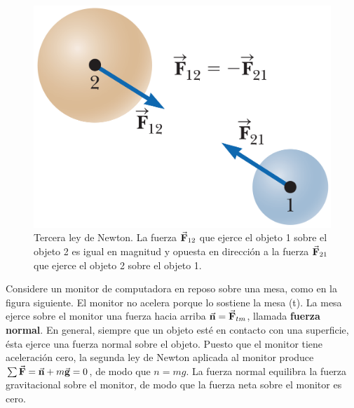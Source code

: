     \begin{figure}[H]
      \centering
      \includegraphics[scale=0.15]{1/graphics_5/figure_2}
      \caption{Tercera ley de Newton. La fuerza $\vec{\mathbf{F}}_{12}$ que ejerce el objeto 1 sobre el objeto 2 es igual en
      magnitud y opuesta en dirección a la fuerza $\vec{\mathbf{F}}_{21}$ que ejerce el objeto 2 sobre el objeto 1.}
    \end{figure}

    \PN Considere un monitor de computadora en reposo sobre una mesa, como en la figura siguiente. El monitor no acelera
    porque lo sostiene la mesa (t). La mesa ejerce sobre el monitor una fuerza hacia arriba $\vec{\mathbf{n}} = \vec{\mathbf{F}}_{tm}$,
    llamada \textbf{fuerza normal}. En general, siempre que un objeto esté en contacto con una superficie, ésta ejerce
    una fuerza normal sobre el objeto. Puesto que el monitor tiene aceleración cero, la segunda ley de Newton aplicada
    al monitor produce $\sum \vec{\mathbf{F}} = \vec{\mathbf{n}} + m \vec{\mathbf{g}} = 0$, de modo que $n = mg$. La fuerza normal equilibra la fuerza
    gravitacional sobre el monitor, de modo que la fuerza neta sobre el monitor es cero.

